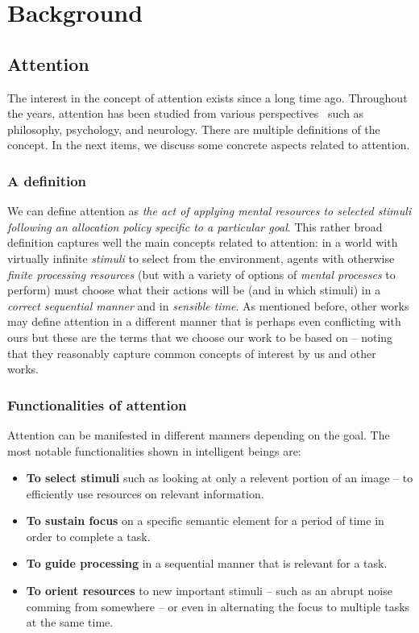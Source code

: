 \documentclass[English]{style/ic-tese-v3}
\begin{document}
\chapter{Background}
\section{Attention}
The interest in the concept of attention exists since a long time ago.
Throughout the years, attention has been studied
from various perspectives~\cite{ref:esther-thesis}
such as philosophy, psychology, and neurology.
There are multiple definitions of the concept.
In the next items, we discuss some concrete aspects related to attention.

\subsection{A definition}
We can define attention as
\emph{the act of applying mental resources to selected stimuli following an allocation policy specific to
    a particular goal}.
This rather broad definition captures well the main concepts related to attention:
in a world with virtually infinite
\emph{stimuli} to select from the environment, agents with otherwise \emph{finite processing
resources} (but with a variety of options of \emph{mental processes} to perform) must choose what their
actions will be (and in which stimuli) in a \emph{correct sequential manner} and in \emph{sensible time}.
As mentioned before, other works may define attention in a different manner
that is perhaps even conflicting with ours but
these are the terms that we choose our work to be based on -- noting that they
reasonably capture common concepts of interest by us and other works.~\cite{ref:helgason}

\subsection{Functionalities of attention}
Attention can be manifested in different manners depending on the goal.
The most notable functionalities shown in intelligent beings are:
\begin{itemize}
    \item \textbf{To select stimuli} such as looking at only a relevent portion of an image --
        to efficiently use resources on relevant information.
    \item \textbf{To sustain focus} on a specific semantic element for a period of time in order to complete
        a task.
    \item \textbf{To guide processing} in a sequential manner that is relevant for a task.
    \item \textbf{To orient resources} to new important stimuli
        -- such as an abrupt noise comming from somewhere --
        or even in alternating the focus to multiple tasks at the same time.
\end{itemize}
\end{document}
